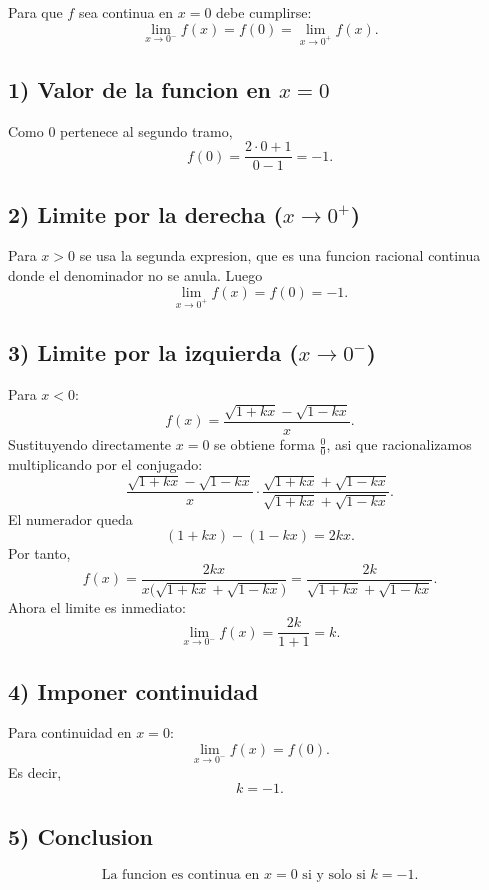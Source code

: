 \documentclass[12pt]{article}
\begin{document}
Para que $f$ sea continua en $x=0$ debe cumplirse:
\[
\lim_{x\to 0^-} f(x)=f(0)=\lim_{x\to 0^+} f(x).
\]

\subsection*{1) Valor de la funcion en $x=0$}

Como $0$ pertenece al segundo tramo,
\[
f(0)=\frac{2\cdot 0+1}{0-1}=-1.
\]

\subsection*{2) Limite por la derecha ($x\to 0^+$)}

Para $x>0$ se usa la segunda expresion, que es una funcion racional continua donde el denominador no se anula. Luego
\[
\lim_{x\to 0^+} f(x)=f(0)=-1.
\]

\subsection*{3) Limite por la izquierda ($x\to 0^-$)}

Para $x<0$:
\[
f(x)=\frac{\sqrt{1+kx}-\sqrt{1-kx}}{x}.
\]
Sustituyendo directamente $x=0$ se obtiene forma $\frac{0}{0}$, asi que racionalizamos multiplicando por el conjugado:
\[
\frac{\sqrt{1+kx}-\sqrt{1-kx}}{x}
\cdot
\frac{\sqrt{1+kx}+\sqrt{1-kx}}{\sqrt{1+kx}+\sqrt{1-kx}}.
\]
El numerador queda
\[
(1+kx)-(1-kx)=2kx.
\]
Por tanto,
\[
f(x)=\frac{2kx}{x\bigl(\sqrt{1+kx}+\sqrt{1-kx}\bigr)}
=\frac{2k}{\sqrt{1+kx}+\sqrt{1-kx}}.
\]
Ahora el limite es inmediato:
\[
\lim_{x\to 0^-} f(x)
=\frac{2k}{1+1}=k.
\]

\subsection*{4) Imponer continuidad}

Para continuidad en $x=0$:
\[
\lim_{x\to 0^-} f(x)=f(0).
\]
Es decir,
\[
k=-1.
\]

\subsection*{5) Conclusion}

\[
\boxed{\text{La funcion es continua en } x=0 \text{ si y solo si } k=-1.}
\]
\end{document}
